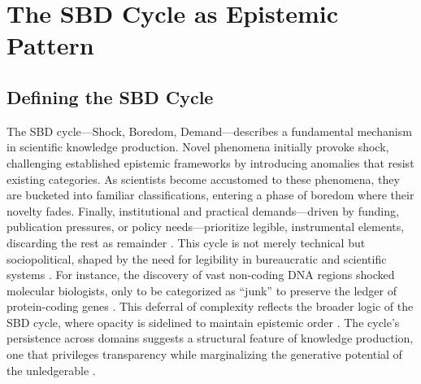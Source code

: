 \documentclass[12pt]{article}
\begin{document}
\section{The SBD Cycle as Epistemic Pattern}

\subsection{Defining the SBD Cycle}
The SBD cycle---Shock, Boredom, Demand---describes a fundamental mechanism in scientific knowledge production. Novel phenomena initially provoke shock, challenging established epistemic frameworks by introducing anomalies that resist existing categories. As scientists become accustomed to these phenomena, they are bucketed into familiar classifications, entering a phase of boredom where their novelty fades. Finally, institutional and practical demands---driven by funding, publication pressures, or policy needs---prioritize legible, instrumental elements, discarding the rest as remainder \citep{latour1987, scott1998}. This cycle is not merely technical but sociopolitical, shaped by the need for legibility in bureaucratic and scientific systems \citep{jasanoff2004}. For instance, the discovery of vast non-coding DNA regions shocked molecular biologists, only to be categorized as ``junk'' to preserve the ledger of protein-coding genes \citep{ohno1972}. This deferral of complexity reflects the broader logic of the SBD cycle, where opacity is sidelined to maintain epistemic order \citep{bowker2005}. The cycle’s persistence across domains suggests a structural feature of knowledge production, one that privileges transparency while marginalizing the generative potential of the unledgerable \citep{star1990}.
\end{document}
